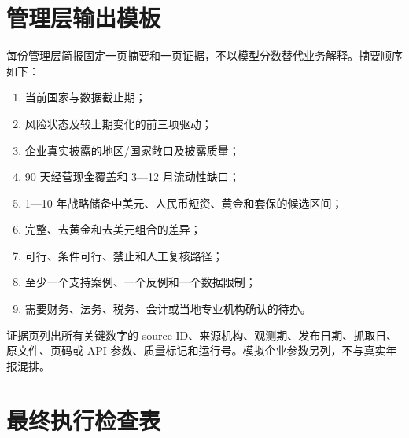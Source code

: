 \documentclass[UTF8,fontset=windows,12pt,openany]{ctexbook}
\begin{document}
\chapter{管理层输出模板}

每份管理层简报固定一页摘要和一页证据，不以模型分数替代业务解释。摘要顺序如下：

\begin{enumerate}
  \item 当前国家与数据截止期；
  \item 风险状态及较上期变化的前三项驱动；
  \item 企业真实披露的地区/国家敞口及披露质量；
  \item 90 天经营现金覆盖和 3—12 月流动性缺口；
  \item 1—10 年战略储备中美元、人民币短资、黄金和套保的候选区间；
  \item 完整、去黄金和去美元组合的差异；
  \item 可行、条件可行、禁止和人工复核路径；
  \item 至少一个支持案例、一个反例和一个数据限制；
  \item 需要财务、法务、税务、会计或当地专业机构确认的待办。
\end{enumerate}

证据页列出所有关键数字的 source ID、来源机构、观测期、发布日期、抓取日、原文件、页码或 API 参数、质量标记和运行号。模拟企业参数另列，不与真实年报混排。

\chapter{最终执行检查表}
\end{document}
